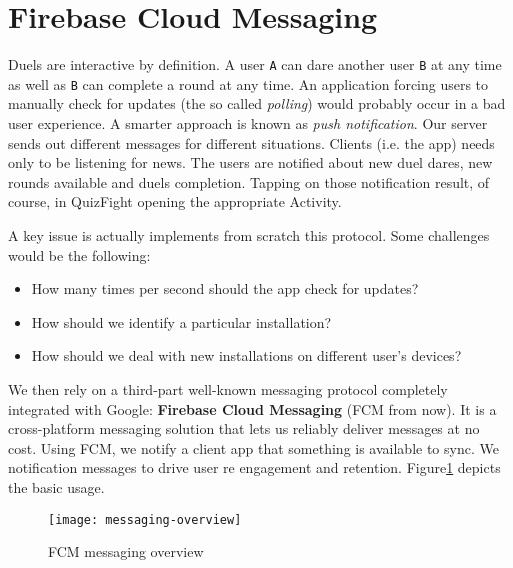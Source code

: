 \section{Firebase Cloud Messaging}
Duels are interactive by definition. A user \texttt{A} can dare another user \texttt{B} at any time as well as \texttt{B} can complete a round at any time. An application forcing users to manually check for updates (the so called \textit{polling}) would probably occur in a bad user experience. A smarter approach is known as \textit{push notification}. Our server sends out different messages for different situations. Clients (i.e. the app) needs only to be listening for news. The users are notified about new duel dares, new rounds available and duels completion. Tapping on those notification result, of course, in QuizFight opening the appropriate Activity. 

A key issue is actually implements from scratch this protocol. Some challenges would be the following:
\begin{itemize}
	\item How many times per second should the app check for updates?
	\item How should we identify a particular installation?
	\item How should we deal with new installations on different user's devices?
\end{itemize}

We then rely on a third-part well-known messaging protocol completely integrated with Google: \textbf{Firebase Cloud Messaging} (FCM from now). It is a cross-platform messaging solution that lets us reliably deliver messages at no cost. Using FCM, we notify a client app that something is available to sync. We notification messages to drive user re engagement and retention. Figure\ref{fig:messaging-overview} depicts the basic usage.
\begin{figure}[h]
	\centering
	\texttt{[image: messaging-overview]}
	\caption[FCM messaging overview]{FCM messaging overview}
	\label{fig:messaging-overview}
\end{figure}

